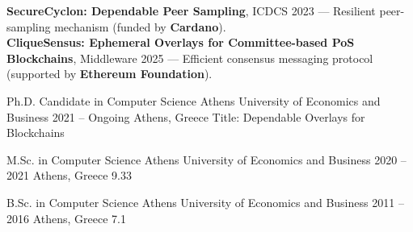 \documentclass[10pt,a4paper,ragged2e,withhyper]{altacv}
\begin{document}
\begin{paracol}{2}


        \textbf{SecureCyclon: Dependable Peer Sampling}, ICDCS 2023 —
        Resilient peer-sampling mechanism (funded by \textbf{Cardano}). \\[0.5em]

        \textbf{CliqueSensus: Ephemeral Overlays for Committee-based PoS Blockchains}, Middleware 2025 —
        Efficient consensus messaging protocol (supported by \textbf{Ethereum Foundation}).


        \cveducation
          {Ph.D. Candidate in Computer Science}
          {Athens University of Economics and Business}
          {2021 -- Ongoing}
          {Athens, Greece}
          {}
          {Title: Dependable Overlays for Blockchains}

        \cveducation
          {M.Sc. in Computer Science}
          {Athens University of Economics and Business}
          {2020 -- 2021}
          {Athens, Greece}
          {9.33}
          {}

        \cveducation
          {B.Sc. in Computer Science}
          {Athens University of Economics and Business}
          {2011 -- 2016}
          {Athens, Greece}
          {7.1}
          {}

    \end{paracol}
\end{document}
